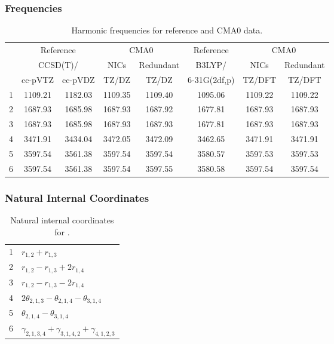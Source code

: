 \documentclass[10pt,oneside]{article}
\begin{document}
\begin{table}[h!]
\subsubsection*{Frequencies}
\centering
\caption{Harmonic frequencies for reference and CMA0 data.}
\begin{tabular}{cccccccc}
\toprule
{} & \multicolumn{2}{c}{Reference} & \multicolumn{2}{c}{CMA0} &    Reference & \multicolumn{2}{c}{CMA0} \\
{} & \multicolumn{2}{c}{CCSD(T)/} &    NICs &  Redundant &       B3LYP/ &    NICs & Redundant \\
{} &   cc-pVTZ & cc-pVDZ &   TZ/DZ &      TZ/DZ & 6-31G(2df,p) &  TZ/DFT &    TZ/DFT \\
\midrule
1 &   1109.21 & 1182.03 & 1109.35 &    1109.40 &      1095.06 & 1109.22 &   1109.22 \\
2 &   1687.93 & 1685.98 & 1687.93 &    1687.92 &      1677.81 & 1687.93 &   1687.93 \\
3 &   1687.93 & 1685.98 & 1687.93 &    1687.93 &      1677.81 & 1687.93 &   1687.93 \\
4 &   3471.91 & 3434.04 & 3472.05 &    3472.09 &      3462.65 & 3471.91 &   3471.91 \\
5 &   3597.54 & 3561.38 & 3597.54 &    3597.54 &      3580.57 & 3597.53 &   3597.53 \\
6 &   3597.54 & 3561.38 & 3597.54 &    3597.55 &      3580.58 & 3597.54 &   3597.54 \\
\bottomrule
\end{tabular}
\end{table}

\begin{table}[h!]
\subsubsection*{Natural Internal Coordinates}
\centering
\caption{Natural internal coordinates for .}
\small
\begin{tabular}{ll}
\toprule
  1   & $r_{1,2} + r_{1,3}$ \\
  2   & $r_{1,2} - r_{1,3} + 2r_{1,4}$ \\
  3   & $r_{1,2} - r_{1,3} - 2r_{1,4}$ \\
  4   & $2\theta_{2,1,3} - \theta_{2,1,4} - \theta_{3,1,4}$ \\
  5   & $\theta_{2,1,4} - \theta_{3,1,4}$ \\
  6   & $\gamma_{2,1,3,4} + \gamma_{3,1,4,2} + \gamma_{4,1,2,3}$ \\
\bottomrule
\end{tabular}
\end{table}
\end{document}
